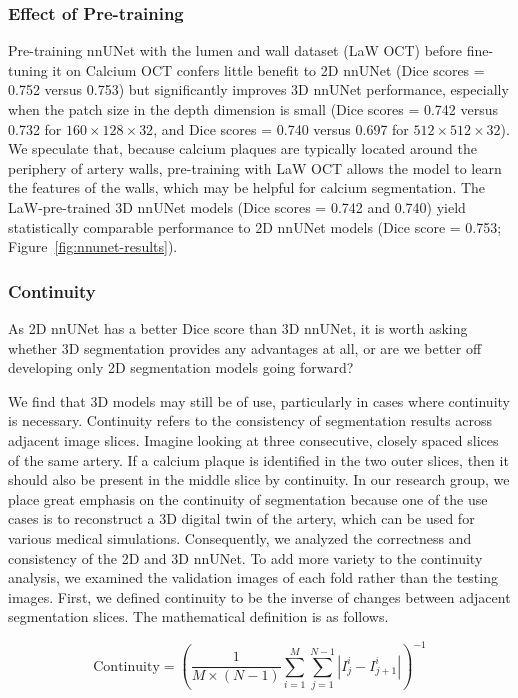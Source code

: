 \documentclass[a4paper,11pt,oneside]{report}
\begin{document}
\subsubsection{Effect of Pre-training}
Pre-training nnUNet with the lumen and wall dataset (LaW OCT) before fine-tuning it on Calcium OCT confers little benefit to 2D nnUNet (Dice scores = 0.752 versus 0.753) but significantly improves 3D nnUNet performance, especially when the patch size in the depth dimension is small (Dice scores = 0.742 versus 0.732 for $160\times 128\times 32$, and Dice scores = 0.740 versus 0.697 for $512\times 512\times 32$). We speculate that, because calcium plaques are typically located around the periphery of artery walls, pre-training with LaW OCT allows the model to learn the features of the walls, which may be helpful for calcium segmentation. The LaW-pre-trained 3D nnUNet models (Dice scores = 0.742 and 0.740) yield statistically comparable performance to 2D nnUNet models (Dice score = 0.753; Figure~\ref{fig:nnunet-results}). 

\subsubsection{Continuity}
As 2D nnUNet has a better Dice score than 3D nnUNet, it is worth asking whether 3D segmentation provides any advantages at all, or are we better off developing only 2D segmentation models going forward?

We find that 3D models may still be of use, particularly in cases where continuity is necessary. Continuity refers to the consistency of segmentation results across adjacent image slices. Imagine looking at three consecutive, closely spaced slices of the same artery. If a calcium plaque is identified in the two outer slices, then it should also be present in the middle slice by continuity. In our research group, we place great emphasis on the continuity of segmentation because one of the use cases is to reconstruct a 3D digital twin of the artery, which can be used for various medical simulations. Consequently, we analyzed the correctness and consistency of the 2D and 3D nnUNet. To add more variety to the continuity analysis, we examined the validation images of each fold rather than the testing images. First, we defined continuity to be the inverse of changes between adjacent segmentation slices. The mathematical definition is as follows.

\begin{equation}
\text{Continuity} = \left(\frac{1}{M\times (N - 1)}\sum_{i = 1}^{M}\sum_{j = 1}^{N-1} \left| I_{j}^{i} - I_{j+1}^{i}\right|\right)^{-1}
\end{equation}
\end{document}
